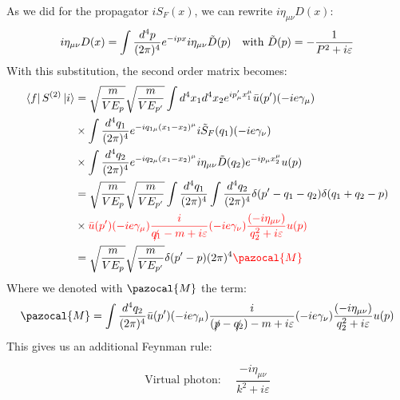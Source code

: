\documentclass[../main.tex]{subfiles}
\begin{document}
As we did for the propagator $iS_F(x)$, we can rewrite $i\eta_{\mu\nu}D(x)$:
\[
i\eta_{\mu\nu}D(x)=\int\frac{d^4p}{(2\pi)^4}e^{-ipx}i\eta_{\mu\nu}\Tilde{D}(p) \quad \text{with } \Tilde{D}(p)=-\frac{1}{P^2+i\varepsilon}
\]
With this substitution, the second order matrix becomes:
\begin{align*}
\bra{f}S^{(2)}\ket{i}&=\sqrt{\frac{m}{VE_p}}\sqrt{\frac{m}{VE_{p'}}}\int d^4x_1d^4x_2e^{ip'_\mu x_1^\mu}\bar{u}(p')(-ie\gamma_\mu)\\
&\times\int\frac{d^4q_1}{(2\pi)^4}e^{-iq_{1\mu}(x_1-x_2)^\mu}i\Tilde{S}_F(q_1)(-ie\gamma_\nu)\\
&\times\int\frac{d^4q_2}{(2\pi)^4}e^{-iq_{2\mu}(x_1-x_2)^\mu}i\eta_{\mu\nu}\Tilde{D}(q_2)e^{-ip_\mu x_2^\mu}u(p)\\
&=\sqrt{\frac{m}{VE_p}}\sqrt{\frac{m}{VE_{p'}}}\int\frac{d^4q_1}{(2\pi)^4}\int\frac{d^4q_2}{(2\pi)^4}\delta(p'-q_1-q_2)\delta(q_1+q_2-p)\\
&\times{\color{red}\bar{u}(p')(-ie\gamma_\mu)\frac{i}{\slashed{q_1}-m+i\varepsilon}(-ie\gamma_\nu)\frac{(-i\eta_{\mu\nu})}{q_2^2+i\varepsilon}u(p)}\\
&=\sqrt{\frac{m}{VE_p}}\sqrt{\frac{m}{VE_{p'}}}\delta(p'-p)(2\pi)^4{\color{red}\pazocal{M}} 
\end{align*}
Where we denoted with $\pazocal{M}$ the term:
\[
\pazocal{M}=\int\frac{d^4q_2}{(2\pi)^4}\bar{u}(p')(-ie\gamma_\mu)\frac{i}{(\slashed{p}-\slashed{q_2})-m+i\varepsilon}(-ie\gamma_\nu)\frac{(-i\eta_{\mu\nu})}{q_2^2+i\varepsilon}u(p)
\]
This gives us an additional Feynman rule:
\begin{kaobox}[frametitle=Feynman rules]
\[
\text{Virtual photon: }\quad \frac{-i\eta_{\mu\nu}}{k^2+i\varepsilon}
\]
\end{kaobox}
\end{document}
